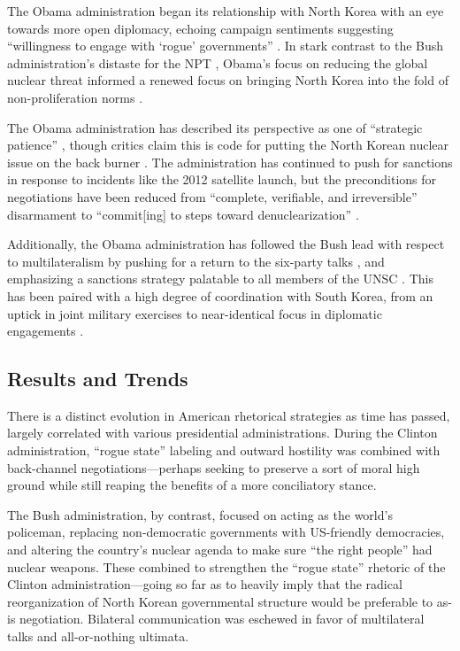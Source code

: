 The Obama administration began its relationship with North Korea with an eye towards more open diplomacy, echoing campaign sentiments suggesting ``willingness to engage with `rogue' governments'' \cite{crs13}. In stark contrast to the Bush administration's distaste for the NPT \cite{huntley}, Obama's focus on reducing the global nuclear threat informed a renewed focus on bringing North Korea into the fold of non-proliferation norms \cite{crs13}.

The Obama administration has described its perspective as one of ``strategic patience'' \cite{crs13}, though critics claim this is code for putting the North Korean nuclear issue on the back burner \cite{green}. The administration has continued to push for sanctions in response to incidents like the 2012 satellite launch, but the preconditions for negotiations have been reduced from ``complete, verifiable, and irreversible'' disarmament \cite{huntley} to ``commit[ing] to steps toward denuclearization'' \cite{crs13}.

Additionally, the Obama administration has followed the Bush lead with respect to multilateralism by pushing for a return to the six-party talks \cite{crs13}, and emphasizing a sanctions strategy palatable to all members of the UNSC \cite{green}. This has been paired with a high degree of coordination with South Korea, from an uptick in joint military exercises to near-identical focus in diplomatic engagements \cite{crs13}.

\subsection{Results and Trends}
There is a distinct evolution in American rhetorical strategies as time has passed, largely correlated with various presidential administrations. During the Clinton administration, ``rogue state'' labeling and outward hostility was combined with back-channel negotiations---perhaps seeking to preserve a sort of moral high ground while still reaping the benefits of a more conciliatory stance.

The Bush administration, by contrast, focused on acting as the world's policeman, replacing non-democratic governments with US-friendly democracies, and altering the country's nuclear agenda to make sure ``the right people'' had nuclear weapons. These combined to strengthen the ``rogue state'' rhetoric of the Clinton administration---going so far as to heavily imply that the radical reorganization of North Korean governmental structure would be preferable to as-is negotiation. Bilateral communication was eschewed in favor of multilateral talks and all-or-nothing ultimata.

